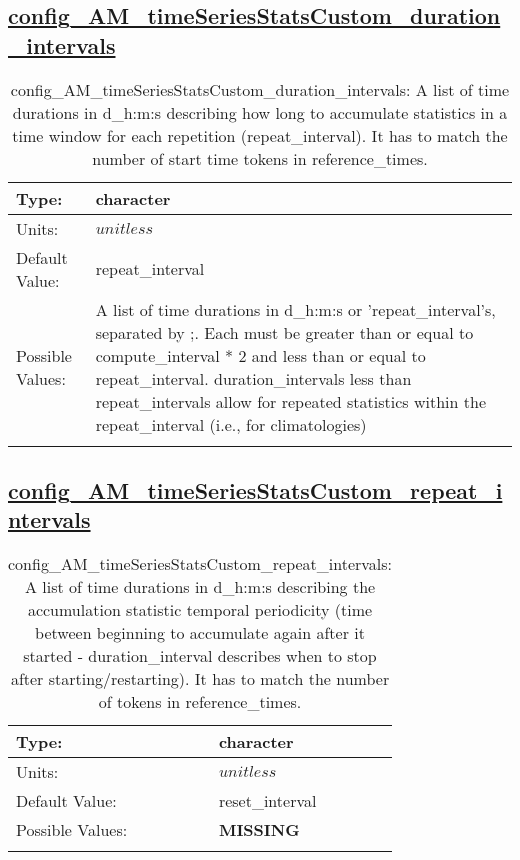 \subsection[config\_AM\_timeSeriesStatsCustom\_duration\_intervals]{\hyperref[sec:nm_tab_AM_timeSeriesStatsCustom]{config\_AM\_timeSeriesStatsCustom\_duration\_intervals}}
\label{subsec:nm_sec_config_AM_timeSeriesStatsCustom_duration_intervals}
\begin{center}
\begin{longtable}{| p{2.0in} || p{4.0in} |}
    \hline
    Type: & character \\
    \hline
    Units: & $unitless$ \\
    \hline
    Default Value: & repeat\_interval \\
    \hline
    Possible Values: & A list of time durations in d\_h:m:s or 'repeat\_interval's, separated by ;. Each must be greater than or equal to compute\_interval * 2 and less than or equal to repeat\_interval. duration\_intervals less than repeat\_intervals allow for repeated statistics within the repeat\_interval (i.e., for climatologies) \\
    \hline
    \caption{config\_AM\_timeSeriesStatsCustom\_duration\_intervals: A list of time durations in d\_h:m:s describing how long to accumulate statistics in a time window for each repetition (repeat\_interval). It has to match the number of start time tokens in reference\_times.}
\end{longtable}
\end{center}
\subsection[config\_AM\_timeSeriesStatsCustom\_repeat\_intervals]{\hyperref[sec:nm_tab_AM_timeSeriesStatsCustom]{config\_AM\_timeSeriesStatsCustom\_repeat\_intervals}}
\label{subsec:nm_sec_config_AM_timeSeriesStatsCustom_repeat_intervals}
\begin{center}
\begin{longtable}{| p{2.0in} || p{4.0in} |}
    \hline
    Type: & character \\
    \hline
    Units: & $unitless$ \\
    \hline
    Default Value: & reset\_interval \\
    \hline
    Possible Values: & {\bf \color{red} MISSING} \\
    \hline
    \caption{config\_AM\_timeSeriesStatsCustom\_repeat\_intervals: A list of time durations in d\_h:m:s describing the accumulation statistic temporal periodicity (time between beginning to accumulate again after it started - duration\_interval describes when to stop after starting/restarting). It has to match the number of tokens in reference\_times.}
\end{longtable}
\end{center}
